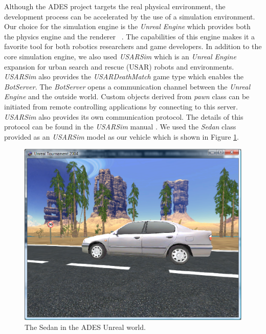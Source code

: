 \documentclass[letterpaper, 10 pt, conference]{ieeeconf}
\begin{document}
Although the ADES project targets the real physical environment, the development process can be accelerated by the use of a simulation environment. Our choice for the simulation engine is the \textit{Unreal Engine} which provides both the physics engine and the renderer ~\cite{games2006unreal}. The capabilities of this engine makes it a favorite tool for both robotics researchers and game developers. In addition to the core simulation engine, we also used \textit{USARSim} which is an \textit{Unreal Engine} expansion for urban search and rescue (USAR) robots and environments. \textit{USARSim} also provides the \textit{USARDeathMatch} game type which enables the \textit{BotServer}. The \textit{BotServer} opens a communication channel between the \textit{Unreal Engine} and the outside world. Custom objects derived from \textit{pawn} class can be initiated from remote controlling applications by connecting to this server. \textit{USARSim} also provides its own communication protocol. The details of this protocol can be found in the \textit{USARSim} manual \cite{carpin2007usarsim}.  We used the \textit{Sedan} class provided as an \textit{USARSim} model as our vehicle which is shown in Figure \ref{fig:Sedan}.

\begin{figure}[ht]
\begin{center}
\includegraphics[scale=0.25]{img/Sedan}
\caption{The Sedan in the ADES Unreal world.}
\label{fig:Sedan}
\end{center}
\end{figure}
\end{document}
